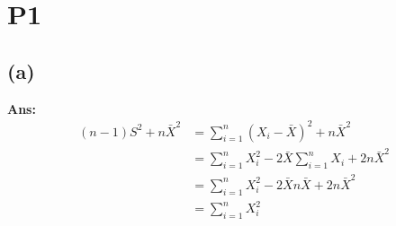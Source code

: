 \documentclass[twoside]{homework}
\begin{document}
\maketitle

\section*{P1}

\subsection*{(a)}
\textbf{Ans:}\\
\begin{equation}
\begin{aligned}
(n-1)S^2+n\bar{X}^2 &= \sum_{i=1}^{n} (X_i-\bar{X})^2 + n\bar{X}^2\\
&= \sum_{i=1}^{n}X_i^2 - 2\bar{X} \sum_{i=1}^{n} X_i +2n\bar{X}^2\\
&= \sum_{i=1}^{n}X_i^2 - 2\bar{X} n \bar{X} +2n\bar{X}^2\\
&= \sum_{i=1}^{n}X_i^2
\end{aligned}
\end{equation}
\end{document}
